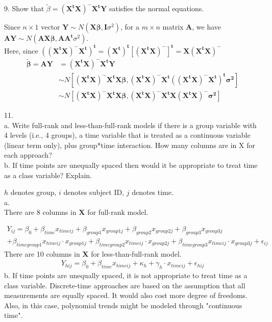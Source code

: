 \documentclass[12pt, utf8]{article}
\begin{document}
\begin{problem}
9. Show that $\widetilde{\beta} = \boldsymbol{(X^{t}X)^{-}X^tY} $ satisfies the normal equations.
\end{problem}
Since $n \times 1$ vector $\boldsymbol{Y} \sim N(\boldsymbol{X\beta}, \boldsymbol{I}\sigma^2)$,
for a $m\times n$ matrix $\boldsymbol{A}$, we have $\boldsymbol{AY} \sim N(\boldsymbol{AX\beta}, \boldsymbol{A} \boldsymbol{A^{t}}\sigma^2) $. \\
Here, since $ \boldsymbol{ ((X^{t}X)^{-}X^t)^t = (X^t)^t[(X^tX)^-]^t = X(X^{t}X)^{-} }$
\begin{equation} 
\begin{split}
\boldsymbol{\widetilde{\beta}}  = \boldsymbol{AY} &=  \boldsymbol{(X^{t}X)^{-}X^tY} \\
& \sim N[\boldsymbol{(X^{t}X)^{-}X^tX\beta}, \boldsymbol{(X^{t}X)^{-}X^{t}((X^{t}X)^{-}X^t)^t\sigma^{2}}] \\
& \sim N[\boldsymbol{(X^{t}X)^{-}X^{t}X\beta}, \boldsymbol{(X^{t}X)^{-}X^{t}X(X^{t}X)^{-}\sigma^{2}}]
\end{split}
\end{equation}

\begin{problem}
11. \\
a. Write full-rank and less-than-full-rank models if there is a group variable with 4 levels (i.e., 4 groups), a time variable that is treated as a continuous variable (linear term only), plus group*time interaction.  How many columns are in X for each approach? \\
b. If time points are unequally spaced then would it be appropriate to treat time as a class variable?  Explain.
\end{problem}
$h$ denotes group, $i$ denotes subject ID, $j$ denotes time. \\
a. \\ 
There are 8 columns in $\boldsymbol{X}$ for full-rank model. 

\begin{multline*}
 Y_{ij} = \beta_0 + \beta_{time}x_{time ij} + \beta_{group1}x_{group1j} + \beta_{group2}x_{group2j} + \beta_{group3}x_{group3j} \\  +  \beta_{timegroup1}x_{time ij} \cdot x_{group1j} +  \beta_{timegroup2}x_{time ij} \cdot x_{group2j} +  \beta_{timegroup3}x_{time ij} \cdot x_{group3j} + \epsilon_{ij} 
\end{multline*}
There are 10 columns in $\boldsymbol{X}$ for less-than-full-rank model.
\begin{align*}
Y_{hij} = \beta_0 + \beta_{time}x_{time ij} + \kappa_h + \gamma_h \cdot x_{time ij} + \epsilon_{hij}
\end{align*}
b. If time points are unequally spaced, it is not appropriate to treat time as a class variable. Discrete-time approaches are based on the assumption that all measurements are equally spaced. It would also cost more degree of freedoms. Also, in this case, polynomial trends might be modeled through "continuous time".   \\ 
\end{document}

